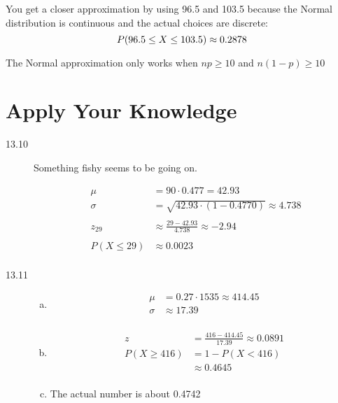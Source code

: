 \documentclass[letterpaper, landscape]{exam}
\begin{document}
  You get a closer approximation by using 96.5 and 103.5 because the Normal
  distribution is continuous and the actual choices are discrete:
  \[
    P(96.5 \leq X \leq 103.5) \approx 0.2878 \\
  \]

  The Normal approximation only works when $np \geq 10$ and $n(1 - p) \geq 10$

  \section{Apply Your Knowledge}
  \begin{description}
    \item[13.10]
      Something fishy seems to be going on.

      \begin{align*}
        \mu          & = 90 \cdot 0.477 = 42.93 \\
        \sigma       & = \sqrt{42.93 \cdot (1 - 0.4770)} \approx 4.738 \\
        \\
        z_{29}       & \approx \frac{29 - 42.93}{4.738} \approx -2.94 \\
        \\
        P(X \leq 29) & \approx 0.0023 \\
    \end{align*}

    \item[13.11]
      \begin{enumerate}[(a)]
        \item 
          \begin{align*}
            \mu    & = 0.27 \cdot 1535 \approx 414.45 \\
            \sigma & \approx 17.39 \\
          \end{align*}

        \item
          \begin{align*}
            z             & = \frac{416 - 414.45}{17.39} \approx 0.0891 \\
            P(X \geq 416) & = 1 - P(X < 416) \\
                          & \approx 0.4645 \\
          \end{align*}

        \item The actual number is about 0.4742


\end{enumerate}
\end{description}
\end{document}
